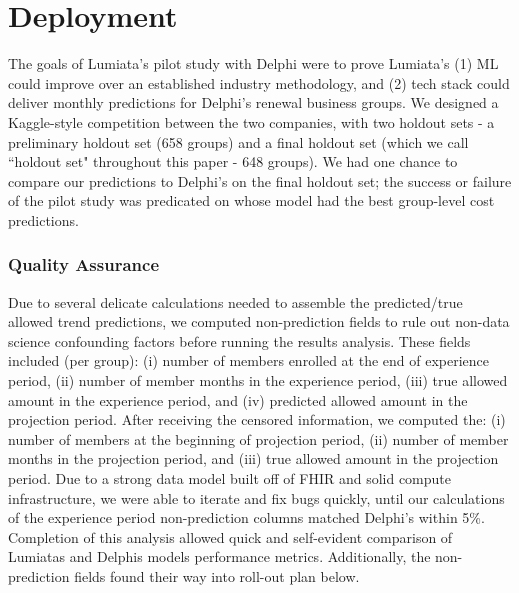 \documentclass[letterpaper]{article}
\begin{document}
\section*{Deployment}\label{sec:deployment}
The goals of Lumiata's pilot study with Delphi were to prove Lumiata's (1) ML could improve over an established industry methodology, and (2) tech stack could deliver monthly predictions for Delphi's renewal business groups. We designed a Kaggle-style competition between the two companies, with two holdout sets - a preliminary holdout set (658 groups) and a final holdout set (which we call ``holdout set" throughout this paper - 648 groups). We had one chance to compare our predictions to Delphi's on the final holdout set; the success or failure of the pilot study was predicated on whose model had the best group-level cost predictions.
\subsubsection{Quality Assurance}
Due to several delicate calculations needed to assemble the predicted/true allowed trend predictions, we computed non-prediction fields to rule out non-data science confounding factors before running the results analysis. These fields included (per group):
(i) number of members enrolled at the end of experience period,
(ii) number of member months in the experience period,
(iii) true allowed amount in the experience period, and
(iv) predicted allowed amount in the projection period.
After receiving the censored information, we computed the:
(i) number of members at the beginning of projection period,
(ii) number of member months in the projection period, and
(iii) true allowed amount in the projection period.
Due to a strong data model built off of FHIR and solid compute infrastructure, we were able to iterate and fix bugs quickly, until our calculations of the experience period non-prediction columns matched Delphi's within 5\%. Completion of this analysis allowed quick and self-evident comparison of Lumiatas and Delphis models performance metrics. Additionally, the non-prediction fields found their way into roll-out plan below.
\end{document}
